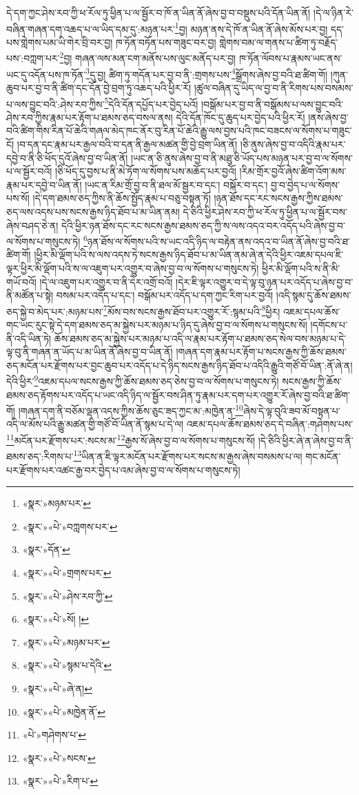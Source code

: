 དེ་དག་ཀྱང་ཤེས་རབ་ཀྱི་ཕ་རོལ་ཏུ་ཕྱིན་པ་ལ་སྦྱོར་བ་ཁོ་ན་ཡིན་ནོ་ཞེས་བྱ་བ་བསྡུས་པའི་དོན་ཡིན་ནོ། །དེ་ལ་ཉིན་རེ་བཞིན་གཞན་དག་འཆད་པ་ལ་ཡིད་དམ་དུ་:མཉན་པར་\footnote{«སྣར་»མཉམ་པར་}བྱ། མཉན་ནས་དེ་ཁོ་ན་ཡིན་ནོ་ཞེས་མོས་པར་བྱ། དད་པས་གླེགས་པམ་ཡི་གེར་བྲི་བར་བྱ། ཁ་ཏོན་བཏོན་པས་གཟུང་བར་བྱ། གླེགས་བམ་ལ་གནས་པ་ཚིག་ཏུ་བརྗོད་པས་:བཀླག་པར་\footnote{«སྣར་»«པེ་»བཀླགས་པར་}བྱ། གཞན་ལས་མན་ངག་མནོས་པས་ལུང་མནོད་པར་བྱ། ཁ་ཏོན་ལོབས་པ་རྣམས་ཡང་ནས་ཡང་དུ་འདོན་པས་ཁ་ཏོན་\footnote{«སྣར་»དོན་}དུ་བྱ། ཚིག་ཏུ་གདོན་པར་བྱ་བ་ནི་:གྲགས་པས་\footnote{«སྣར་»«པེ་»གྲགས་པར་}སྒྲོགས་ཞེས་བྱ་བའི་ཐ་ཚིག་གོ། །ཀུན་ཆུབ་པར་བྱ་བ་ནི་ཚིག་དང་དོན་བྱེ་བྲག་ཏུ་འཆད་པའི་ཕྱིར་རོ། །ཚུལ་བཞིན་དུ་ཡིད་ལ་བྱ་བ་ནི་རིགས་པས་བསམས་པ་ལས་བྱུང་བའི་:ཤེས་རབ་ཀྱིས་\footnote{«སྣར་»«པེ་»ཤེས་རབ་ཀྱི་}དེའི་དོན་དཔྱོད་པར་བྱེད་པའོ། །བསྒོམ་པར་བྱ་བ་ནི་བསྒོམས་པ་ལས་བྱུང་བའི་ཤེས་རབ་ཀྱིས་རྣམ་པར་རྟོག་པ་ཐམས་ཅད་བསལ་ནས། དེའི་དོན་ཁོང་དུ་ཆུད་པར་བྱེད་པའི་ཕྱིར་རོ། །ནས་ཞེས་བྱ་བའི་ཚིག་གིས་རིན་པོ་ཆེའི་གཞལ་མེད་ཁང་ནོར་བུ་རིན་པོ་ཆེའི་རྒྱུ་ལས་བྱས་པའི་ཁང་བཟངས་ལ་སོགས་པ་གཟུང་ངོ། །བ་དན་དང་རྣམ་པར་རྒྱལ་བའི་བ་དན་ནི་རྒྱལ་མཚན་གྱི་བྱེ་བྲག་ཡིན་ནོ། །ཅི་ནུས་ཞེས་བྱ་བ་འདིའི་རྣམ་པར་དབྱེ་བ་ནི་ཅི་ཕོད་དུའོ་ཞེས་བྱ་བ་ཡིན་ནོ། །ཡང་ན་ཅི་ནུས་ཞེས་བྱ་བ་ནི་མཐུ་ཅི་ཡོད་པས་མཉན་པར་བྱ་བ་ལ་སོགས་པ་ལ་སྦྱོར་བའོ། །ཅི་ཕོད་དུ་བྱས་པ་ནི་མེ་ཏོག་ལ་སོགས་པས་མཆོད་པར་བྱའོ། །རིམ་གྲོར་བྱའོ་ཞེས་ཚིག་འོག་མས་རྣམ་པར་དབྱེ་བ་ཡིན་ནོ། །ཡང་ན་རིམ་གྲོ་བྱ་བ་ནི་ཐལ་མོ་སྦྱར་བ་དང་། བསྐོར་བ་དང་། བྱ་བ་བྱེད་པ་ལ་སོགས་པས་སོ། །དེ་དག་ཐམས་ཅད་ཀྱིས་ནི་ཆོས་སྤྱོད་རྣམ་པ་བཅུ་བསྟན་ཏོ། །ཉན་ཐོས་དང་རང་སངས་རྒྱས་ཀྱིས་ཐམས་ཅད་ལས་འདས་པས་སངས་རྒྱས་ཉིད་ཐོབ་པ་མ་ཡིན་ནམ། དེ་ཅིའི་ཕྱིར་ཤེས་རབ་ཀྱི་ཕ་རོལ་ཏུ་ཕྱིན་པ་ལ་སྦྱོར་བས་ཞེས་བཤད་ཅེ་ན། དེའི་ཕྱིར་ཉན་ཐོས་དང་རང་སངས་རྒྱས་ཐམས་ཅད་ཀྱི་ས་ལས་འདའ་བར་འདོད་པའི་ཞེས་བྱ་བ་ལ་སོགས་པ་གསུངས་ཏེ། \footnote{«སྣར་»«པེ་»སོ། ། }ཉན་ཐོས་ལ་སོགས་པའི་ས་ཡང་འདི་ཉིད་ལ་བརྟེན་ནས་འདའ་བ་ཡིན་ནོ་ཞེས་བྱ་བའི་ཐ་ཚིག་གོ། །ཕྱིར་མི་ལྡོག་པའི་ས་ལས་འདས་ཏེ་སངས་རྒྱས་ཉིད་ཐོབ་པ་མ་ཡིན་ནམ་ཞེ་ན་དེའི་ཕྱིར་འཇམ་དཔལ་ཇི་ལྟར་ཕྱིར་མི་ལྡོག་པའི་ས་ལ་འཇུག་པར་འགྱུར་བ་ཞེས་བྱ་བ་ལ་སོགས་པ་གསུངས་ཏེ། ཕྱིར་མི་ལྡོག་པའི་ས་ནི་མི་གཡོ་བའོ། །དེ་ལ་འཇུག་པར་འགྱུར་བ་ནི་དེར་འགྲོ་བའོ། །དེར་ཇི་ལྟར་འགྱུར་བ་དེ་ལྟ་བུ་ཉན་པར་འདོད་པ་ཞེས་བྱ་བ་ནི་མཚོན་པ་སྟེ། བསམ་པར་འདོད་པ་དང་། བསྒོམ་པར་འདོད་པ་དག་ཀྱང་རིག་པར་བྱའོ། །འདི་སྙམ་དུ་ཆོས་ཐམས་ཅད་སྐྱེ་བ་མེད་པར་:མཉམ་པས་\footnote{«སྣར་»«པེ་»མཉམ་པར་}མོས་བས་སངས་རྒྱས་ཐོབ་པར་འགྱུར་རོ་:སྙམ་པའི་\footnote{«སྣར་»«པེ་»སྙམ་པ་དེའི་}ཕྱིར། འཇམ་དཔལ་ཆོས་གང་ཡང་རུང་སྟེ་དེ་དག་ཐམས་ཅད་མ་སྐྱེས་པར་མཉམ་པ་ཉིད་དུ་ཞེས་བྱ་བ་ལ་སོགས་པ་གསུངས་སོ། །དགོངས་པ་ནི་འདི་ཡིན་ཏེ། ཆོས་ཐམས་ཅད་མ་སྐྱེས་པར་མཉམ་པ་འདི་ལ་རྣམ་པར་རྟོག་པ་ཐམས་ཅད་སེལ་བས་མཉམ་པ་དེ་ལྟ་བུ་ནི་གཞན་ན་ཡོད་པ་མ་ཡིན་ནོ་ཞེས་བྱ་བ་ཡིན་ནོ། །གཞན་དག་རྣམ་པར་རྟོག་པ་སངས་རྒྱས་ཀྱི་ཆོས་ཐམས་ཅད་མངོན་པར་རྫོགས་པར་བྱང་ཆུབ་པར་འདོད་པ་དེ་ཉིད་སངས་རྒྱས་ཉིད་ཐོབ་པ་འདིའི་རྒྱུའི་གཙོ་བོ་ཡིན་:ནོ་ཞེ་ན།དེའི་ཕྱིར་\footnote{«སྣར་»«པེ་»ཞེ་ན།}འཇམ་དཔལ་སངས་རྒྱས་ཀྱི་ཆོས་ཐམས་ཅད་ཅེས་བྱ་བ་ལ་སོགས་པ་གསུངས་ཏེ། སངས་རྒྱས་ཀྱི་ཆོས་ཐམས་ཅད་རྟོགས་པར་འདོད་པ་ཡང་འདི་ཉིད་ལ་སྦྱོར་བས་ཤིན་ཏུ་རྣམ་པར་དག་པར་འགྱུར་རོ་ཞེས་བྱ་བའི་ཐ་ཚིག་གོ། །གཞན་དག་ནི་བཅོམ་ལྡན་འདས་ཀྱིས་ཆོས་ཅུང་ཟད་ཀྱང་མ་:མཁྱེན་ན་\footnote{«སྣར་»«པེ་»མཁྱེན་ནོ་}ཞེས་དེ་ལྟ་བུའི་ཟབ་མོ་བསྟན་པ་འདི་ལ་མོས་པའི་རྒྱུ་མཚན་གྱི་གཙོ་བོ་ཡིན་ནོ་སྙམ་པ་དེ་ལ། འཇམ་དཔལ་ཆོས་ཐམས་ཅད་དེ་བཞིན་:གཤེགས་པས་\footnote{«པེ་»གཤེགས་པ་}མངོན་པར་རྫོགས་པར་:སངས་མ་\footnote{«སྣར་»«པེ་»སངས་}རྒྱས་སོ་ཞེས་བྱ་བ་ལ་སོགས་པ་གསུངས་སོ། །དེ་ཅིའི་ཕྱིར་ཞེ་ན་ཞེས་བྱ་བ་ནི་ཐམས་ཅད་:རིགས་པ་\footnote{«སྣར་»«པེ་»རིག་པ་}ཡིན་ན་ཇི་ལྟར་མངོན་པར་རྫོགས་པར་སངས་མ་རྒྱས་ཞེས་བསམས་པ་ལ། གང་མངོན་པར་རྫོགས་པར་འཚང་རྒྱ་བར་བྱེད་པ་འམ་ཞེས་བྱ་བ་ལ་སོགས་པ་གསུངས་ཏེ། 
